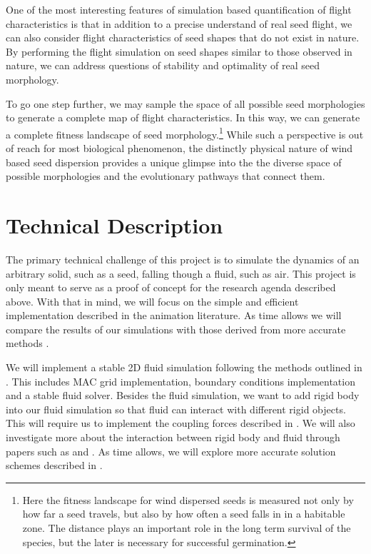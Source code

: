\documentclass[annual]{acmsiggraph}
\begin{document}

One of the most interesting features of simulation based quantification of flight characteristics is that in addition to a precise understand of real seed flight, we can also consider  flight characteristics of seed shapes that do not exist in nature. By performing the flight simulation on seed shapes similar to those observed in nature, we can address questions of stability and optimality of real seed morphology.

To go one step further, we may sample the space of all possible seed morphologies to generate a complete map of flight characteristics.  In this way, we can generate a complete fitness landscape of seed morphology.\footnote{Here the fitness landscape for wind dispersed seeds is measured not only by how far a seed travels, but also by how often a seed falls in in a habitable zone.  The distance plays an important role in the long term survival of the species, but the later is necessary for successful germination.}   While such a perspective is out of reach for most biological phenomenon, the distinctly physical nature of wind based seed dispersion provides a unique glimpse into the  the diverse space of possible morphologies and the evolutionary pathways that connect them.    

\section{Technical Description}
The primary technical challenge of this project is to simulate the dynamics of an arbitrary solid, such as a seed, falling though a fluid, such as air.  This project is only meant to serve as a proof of concept for the research agenda  described above.  With that in mind, we will focus on the simple and efficient implementation described in the animation literature.   As time allows we will compare the results of our simulations with those derived from more accurate methods \cite{wang2005-9}.

We will implement a stable 2D fluid simulation following the methods outlined in \cite{bridson2006}. This includes MAC grid implementation, boundary conditions implementation and a stable fluid solver. Besides the fluid simulation, we want to add rigid body into our fluid simulation so that fluid can interact with different rigid objects. This will require us to implement the coupling forces described in \cite{carlson2004}. We will also investigate more about the interaction between rigid body and fluid through papers such as \cite{guendelman2005} and \cite{baxter2004}.  As time allows, we will explore more accurate solution schemes described in \cite{osher2002}.
\end{document}
